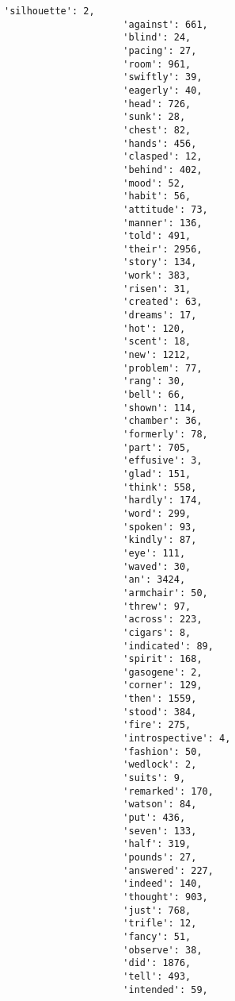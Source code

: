 \documentclass[11pt]{article}
\begin{document}
\begin{Verbatim}[commandchars=\\\{\}]
                     'silhouette': 2,
                     'against': 661,
                     'blind': 24,
                     'pacing': 27,
                     'room': 961,
                     'swiftly': 39,
                     'eagerly': 40,
                     'head': 726,
                     'sunk': 28,
                     'chest': 82,
                     'hands': 456,
                     'clasped': 12,
                     'behind': 402,
                     'mood': 52,
                     'habit': 56,
                     'attitude': 73,
                     'manner': 136,
                     'told': 491,
                     'their': 2956,
                     'story': 134,
                     'work': 383,
                     'risen': 31,
                     'created': 63,
                     'dreams': 17,
                     'hot': 120,
                     'scent': 18,
                     'new': 1212,
                     'problem': 77,
                     'rang': 30,
                     'bell': 66,
                     'shown': 114,
                     'chamber': 36,
                     'formerly': 78,
                     'part': 705,
                     'effusive': 3,
                     'glad': 151,
                     'think': 558,
                     'hardly': 174,
                     'word': 299,
                     'spoken': 93,
                     'kindly': 87,
                     'eye': 111,
                     'waved': 30,
                     'an': 3424,
                     'armchair': 50,
                     'threw': 97,
                     'across': 223,
                     'cigars': 8,
                     'indicated': 89,
                     'spirit': 168,
                     'gasogene': 2,
                     'corner': 129,
                     'then': 1559,
                     'stood': 384,
                     'fire': 275,
                     'introspective': 4,
                     'fashion': 50,
                     'wedlock': 2,
                     'suits': 9,
                     'remarked': 170,
                     'watson': 84,
                     'put': 436,
                     'seven': 133,
                     'half': 319,
                     'pounds': 27,
                     'answered': 227,
                     'indeed': 140,
                     'thought': 903,
                     'just': 768,
                     'trifle': 12,
                     'fancy': 51,
                     'observe': 38,
                     'did': 1876,
                     'tell': 493,
                     'intended': 59,

\end{Verbatim}
\end{document}
